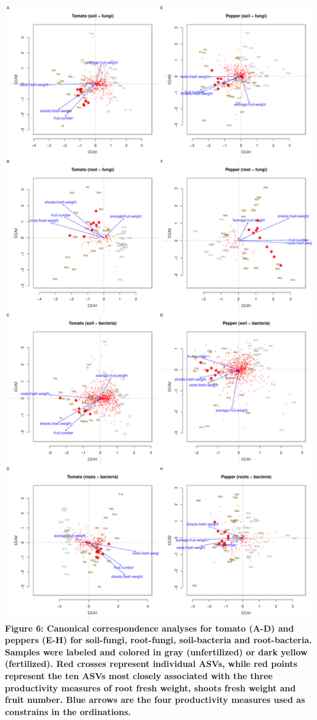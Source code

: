 \documentclass[11pt,]{article}
\begin{document}
\newpage   \includegraphics{../figures/Figure6_rda.pdf}\\
\textbf{Figure 6: Canonical correspondence analyses for tomato (A-D) and
peppers (E-H) for soil-fungi, root-fungi, soil-bacteria and
root-bacteria. Samples were labeled and colored in gray (unfertilized)
or dark yellow (fertilized). Red crosses represent individual ASVs,
while red points represent the ten ASVs most closely associated with the
three productivity measures of root fresh weight, shoots fresh weight
and fruit number. Blue arrows are the four productivity measures used as
constrains in the ordinations.} ~\\
\end{document}
